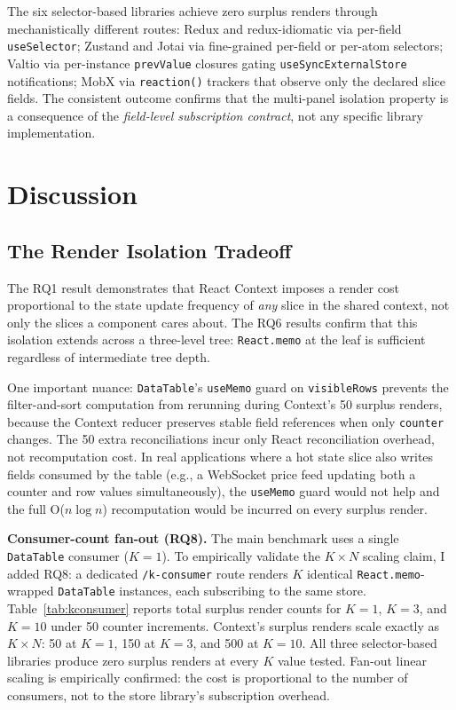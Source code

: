 \documentclass[conference]{IEEEtran}
\newcommand{\code}[1]{\texttt{\small #1}}
\begin{document}
The six selector-based libraries achieve zero surplus renders through
mechanistically different routes: Redux and redux-idiomatic via per-field
\code{useSelector}; Zustand and Jotai via fine-grained per-field or per-atom
selectors; Valtio via per-instance \code{prevValue} closures gating
\code{useSyncExternalStore} notifications; MobX via \code{reaction()} trackers
that observe only the declared slice fields.
The consistent outcome confirms that the multi-panel isolation property is
a consequence of the \emph{field-level subscription contract}, not any
specific library implementation.

\section{Discussion}
\label{sec:discussion}

\subsection{The Render Isolation Tradeoff}

The RQ1 result demonstrates that React Context imposes a render cost
proportional to the state update frequency of \emph{any} slice in the
shared context, not only the slices a component cares about. The RQ6
results confirm that this isolation extends across a three-level tree:
\code{React.memo} at the leaf is sufficient regardless of intermediate
tree depth.

One important nuance: \code{DataTable}'s \code{useMemo} guard
on \code{visibleRows} prevents the filter-and-sort computation from
rerunning during Context's 50 surplus renders, because the Context
reducer preserves stable field references when only \code{counter}
changes. The 50 extra reconciliations incur only React reconciliation
overhead, not recomputation cost. In real applications where a hot state
slice also writes fields consumed by the table (e.g., a WebSocket price
feed updating both a counter and row values simultaneously), the
\code{useMemo} guard would not help and the full O($n \log n$)
recomputation would be incurred on every surplus render.

\textbf{Consumer-count fan-out (RQ8).}
The main benchmark uses a single \code{DataTable} consumer ($K{=}1$).
To empirically validate the $K{\times}N$ scaling claim, I added RQ8:
a dedicated \code{/k-consumer} route renders $K$ identical
\code{React.memo}-wrapped \code{DataTable} instances, each subscribing
to the same store. Table~\ref{tab:kconsumer} reports total surplus
render counts for $K{=}1$, $K{=}3$, and $K{=}10$ under 50 counter
increments. Context's surplus renders scale exactly as $K{\times}N$:
50 at $K{=}1$, 150 at $K{=}3$, and 500 at $K{=}10$. All three
selector-based libraries produce zero surplus renders at every $K$
value tested. Fan-out linear scaling is empirically confirmed: the
cost is proportional to the number of consumers, not to the store
library's subscription overhead.
\end{document}
